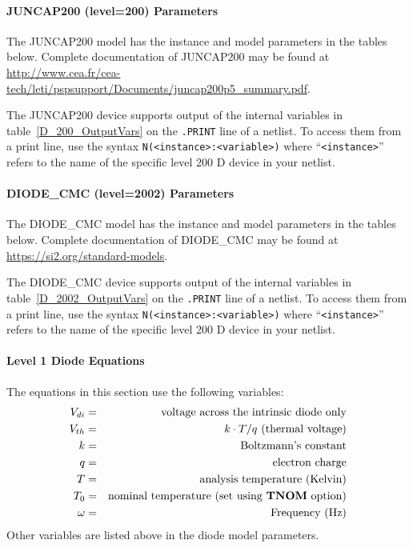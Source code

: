\paragraph{JUNCAP200 (level=200) Parameters}
The JUNCAP200 model has the instance and model parameters in the
tables below.  Complete documentation of JUNCAP200 may be found at
\url{http://www.cea.fr/cea-tech/leti/pspsupport/Documents/juncap200p5_summary.pdf}.


The JUNCAP200 device supports output of the internal variables in
table~\ref{D_200_OutputVars} on the \texttt{.PRINT} line of a netlist.
To access them from a print line, use the syntax
\texttt{N(<instance>:<variable>)} where ``\texttt{<instance>}'' refers to the
name of the specific level 200 D device in your netlist.





\paragraph{DIODE\_CMC (level=2002) Parameters}
The DIODE\_CMC model has the instance and model parameters in the
tables below.  Complete documentation of DIODE\_CMC may be found at
\url{https://si2.org/standard-models}.


The DIODE\_CMC device supports output of the internal variables in
table~\ref{D_2002_OutputVars} on the \texttt{.PRINT} line of a netlist.
To access them from a print line, use the syntax
\texttt{N(<instance>:<variable>)} where ``\texttt{<instance>}'' refers to the
name of the specific level 200 D device in your netlist.





\paragraph{Level 1 Diode Equations}

The equations in this section use the following variables:
\begin{eqnarray*}
V_{di} & = & \mbox{voltage across the intrinsic diode only} \\
V_{th} & = & \mbox{$k \cdot T/q$ (thermal voltage)}         \\
k      & = & \mbox{Boltzmann's constant}                    \\
q      & = & \mbox{electron charge}                         \\
T      & = & \mbox{analysis temperature (Kelvin)}           \\
T_{0}  & = & \mbox{nominal temperature (set using \textrm{\textbf{TNOM}}
option)} \\
\omega & = & \mbox{Frequency (Hz)}
\end{eqnarray*}
Other variables are listed above in the diode model parameters.


